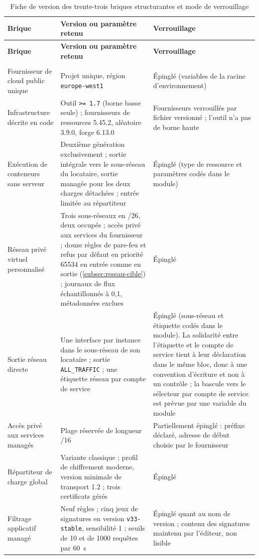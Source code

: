 \begingroup
\scriptsize
\setlength{\tabcolsep}{3pt}
\renewcommand{\arraystretch}{1.0}
\setlength{\LTpre}{4pt}
\setlength{\LTpost}{4pt}
\begin{longtable}{|P{3.4cm}|P{7.5cm}|P{4.4cm}|}
\caption[Fiche de version des briques structurantes]{Fiche de version des trente-trois briques structurantes et mode de verrouillage}
\label{tab:fiche-versions}\\
\hline
\textbf{Brique} & \textbf{Version ou paramètre retenu} & \textbf{Verrouillage} \\
\hline
\endfirsthead
\hline
\textbf{Brique} & \textbf{Version ou paramètre retenu} & \textbf{Verrouillage} \\
\hline
\endhead
\hline
\endfoot
{} \\ \hline
Fournisseur de cloud public unique &
Projet unique, région \texttt{europe-west1} &
Épinglé (variables de la racine d'environnement) \\ \hline
Infrastructure décrite en code &
Outil \texttt{>= 1.7} (borne basse seule) ; fournisseurs de ressources 5.45.2, aléatoire 3.9.0,
forge 6.13.0 &
Fournisseurs verrouillés par fichier versionné ; l'outil n'a pas de borne haute \\ \hline
Exécution de conteneurs sans serveur &
Deuxième génération exclusivement ; sortie intégrale vers le sous-réseau du locataire, sortie
managée pour les deux charges détachées ; entrée limitée au répartiteur &
Épinglé (type de ressource et paramètres codés dans le module) \\ \hline
Réseau privé virtuel personnalisé &
Trois sous-réseaux en /26, deux occupés ; accès privé aux services du fournisseur ; douze règles de
pare-feu et refus par défaut en priorité 65534 en entrée comme en sortie
(\cref{subsec:reseau-cible}) ; journaux de flux échantillonnés à 0,1, métadonnées exclues &
Épinglé \\ \hline
Sortie réseau directe &
Une interface par instance dans le sous-réseau de son locataire ; sortie \texttt{ALL\_TRAFFIC} ;
une étiquette réseau par compte de service &
Épinglé (sous-réseau et étiquette codés dans le module). La solidarité entre l'étiquette et le
compte de service tient à leur déclaration dans le même bloc, donc à une convention d'écriture et
non à un contrôle ; la bascule vers le sélecteur par compte de service est prévue par une variable
du module \\ \hline
Accès privé aux services managés &
Plage réservée de longueur /16 &
Partiellement épinglé : préfixe déclaré, adresse de début choisie par le fournisseur \\ \hline
Répartiteur de charge global &
Variante classique ; profil de chiffrement moderne, version minimale de transport 1.2 ; trois
certificats gérés &
Épinglé \\ \hline
Filtrage applicatif managé &
Neuf règles ; cinq jeux de signatures en version \texttt{v33-stable}, sensibilité 1 ; seuils de
10 et de 1000 requêtes par 60~s &
Épinglé quant au nom de version ; contenu des signatures maintenu par l'éditeur, non
lisible \\ \hline


\end{longtable}
